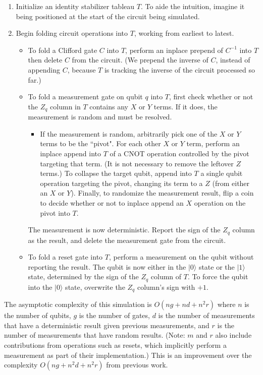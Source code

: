 \documentclass[onecolumn,unpublished]{quantumarticle}
\theoremstyle{definition}
\theoremstyle{definition}
\theoremstyle{definition}
\begin{document}
\begin{enumerate}
    \item Initialize an identity stabilizer tableau $T$.
    To aide the intuition, imagine it being positioned at the start of the circuit being simulated.
    \item Begin folding circuit operations into $T$, working from earliest to latest.
    \begin{itemize}
        \item To fold a Clifford gate $C$ into $T$, perform an inplace prepend of $C^{-1}$ into $T$ then delete $C$ from the circuit.
        (We prepend the inverse of $C$, instead of appending $C$, because $T$ is tracking the inverse of the circuit processed so far.)
        \item To fold a measurement gate on qubit $q$ into $T$, first check whether or not the $Z_q$ column in $T$ contains any $X$ or $Y$ terms.
        If it does, the measurement is random and must be resolved.
        \begin{itemize}
            \item If the measurement is random, arbitrarily pick one of the $X$ or $Y$ terms to be the ``pivot".
            For each other $X$ or $Y$ term, perform an inplace append into $T$ of a CNOT operation controlled by the pivot targeting that term.
            (It is not necessary to remove the leftover $Z$ terms.)
            To collapse the target qubit, append into $T$ a single qubit operation targeting the pivot, changing its term to a $Z$ (from either an $X$ or $Y$).
            Finally, to randomize the measurement result, flip a coin to decide whether or not to inplace append an $X$ operation on the pivot into $T$.
        \end{itemize}
        The measurement is now deterministic.
        Report the sign of the $Z_q$ column as the result, and delete the measurement gate from the circuit.
        \item To fold a reset gate into $T$, perform a measurement on the qubit without reporting the result.
        The qubit is now either in the $|0\rangle$ state or the $|1\rangle$ state, determined by the sign of the $Z_q$ column of $T$.
        To force the qubit into the $|0\rangle$ state, overwrite the $Z_q$ column's sign with $+1$.
    \end{itemize}
\end{enumerate}

The asymptotic complexity of this simulation is $O(ng + nd + n^2r)$ where $n$ is the number of qubits, $g$ is the number of gates, $d$ is the number of measurements that have a deterministic result given previous measurements, and $r$ is the number of measurements that have random results.
(Note: $m$ and $r$ also include contributions from operations such as resets, which implicitly perform a measurement as part of their implementation.)
This is an improvement over the complexity $O(ng + n^2d + n^2r)$ from previous work.
\end{document}
